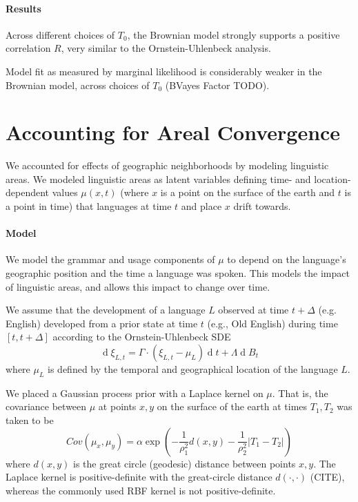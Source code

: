 \documentclass[11pt,a4paper]{article}
\begin{document}
\paragraph{Results}
Across different choices of $T_0$, the Brownian model strongly supports a positive correlation $R$, very similar to the Ornstein-Uhlenbeck analysis.

Model fit as measured by marginal likelihood is considerably weaker in the Brownian model, across choices of $T_0$ (BVayes Factor TODO).



\section{Accounting for Areal Convergence}
We accounted for effects of geographic neighborhoods by modeling linguistic areas.
We modeled linguistic areas as latent variables defining time- and location-dependent values $\mu(x,t)$ (where $x$ is a point on the surface of the earth and $t$ is a point in time) that languages at time $t$ and place $x$ drift towards.

\paragraph{Model}
We model the grammar and usage components of $\mu$ to depend on the language's geographic position and the time a language was spoken.
This models the impact of linguistic areas, and allows this impact to change over time.

We assume that the development of a language $L$ observed at time $t+\Delta$ (e.g. English) developed from a prior state at time $t$ (e.g., Old English) during time $[t, t+\Delta]$ according to the Ornstein-Uhlenbeck SDE
\begin{equation*}
    \operatorname{d}\xi_{L,t} = \Gamma \cdot (\xi_{L,t}-\mu_L) \operatorname{d}t + \Lambda \operatorname{d}B_t
\end{equation*}
where $\mu_L$ is defined by the temporal and geographical location of the language $L$.


We placed a Gaussian process prior with a Laplace kernel on $\mu$.
That is, the covariance between $\mu$ at points $x, y$ on the surface of the earth at times $T_1, T_2$ was taken to be
\begin{equation}\label{eq:kernel}
    Cov(\mu_x, \mu_y) = \alpha \exp\left(-\frac{1}{\rho^2_1} d(x,y) - \frac{1}{\rho_2^2} |T_1-T_2|\right)
\end{equation}
where $d(x,y)$ is the great circle (geodesic) distance between points $x, y$.
The Laplace kernel is positive-definite with the great-circle distance $d(\cdot, \cdot)$ (CITE), whereas the commonly used RBF kernel is not positive-definite.
\end{document}
